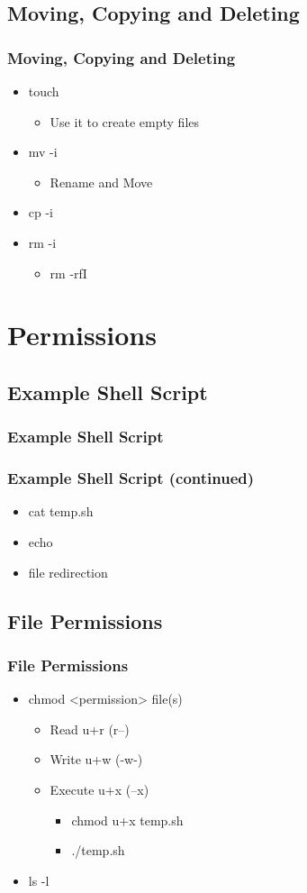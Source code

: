 \documentclass[hyperref={pdfpagelabels=false}]{beamer}
\begin{document}
\subsection{Moving, Copying and Deleting}
\frame
{
    \frametitle{Moving, Copying and Deleting}
    \begin{itemize}
    \item{touch}
        \begin{itemize}
        \item{Use it to create empty files}
        \end{itemize}
    \item{mv -i}
	\begin{itemize}
        \item{Rename and Move}
        \end{itemize}
    \item{cp -i}
    \item{rm -i}
	\begin{itemize}
        \item{rm -rfI}
        \end{itemize}
    \end{itemize}
}
\section{Permissions}
\subsection{Example Shell Script}
\frame
{	
    \frametitle{Example Shell Script}
}
\frame
{
    \frametitle{Example Shell Script (continued)}
    \begin{itemize}
    \item{cat temp.sh}
    \item{echo}
    \item{file redirection}
    \end{itemize}
}
\subsection{File Permissions}
\frame
{
    \frametitle{File Permissions}
    \begin{itemize}
    \item{chmod <permission> file(s)}
        \begin{itemize}
        \item{Read u+r (r--)}
        \item{Write u+w (-w-)}
        \item{Execute u+x (--x)}
            \begin{itemize}
            \item{chmod u+x temp.sh}
            \item{./temp.sh}
            \end{itemize}
        \end{itemize}
    \item{ls -l}
    \end{itemize}
}
\end{document}
